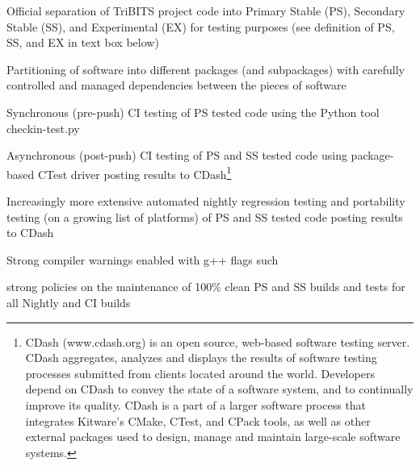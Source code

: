 \documentclass[11pt]{SANDreport}
\begin{document}
\begin{compactitem}

{}\item Official separation of TriBITS project code into Primary Stable (PS), Secondary Stable (SS), and Experimental (EX) for testing purposes (see definition of PS, SS, and EX in text box below)

{}\item Partitioning of software into different packages (and subpackages) with carefully controlled and managed dependencies between the pieces of software

{}\item Synchronous (pre-push) CI testing of PS tested code using the Python tool checkin-test.py

{}\item Asynchronous (post-push) CI testing of PS and SS tested code using package-based CTest driver posting results to CDash\footnote{CDash (www.cdash.org) is an open source, web-based software testing server. CDash aggregates, analyzes and displays the results of software testing processes submitted from clients located around the world. Developers depend on CDash to convey the state of a software system, and to continually improve its quality. CDash is a part of a larger software process that integrates Kitware's CMake, CTest, and CPack tools, as well as other external packages used to design, manage and maintain large-scale software systems.}

{}\item Increasingly more extensive automated nightly regression testing and portability testing (on a growing list of platforms) of PS and SS tested code posting results to CDash

{}\item Strong compiler warnings enabled with g++ flags such {}

{}\item strong policies on the maintenance of 100\% clean PS and SS builds and tests for all Nightly and CI builds

\end{compactitem}
\end{document}
